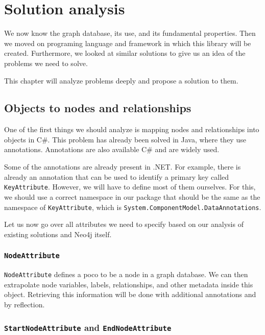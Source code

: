 \chapter {Solution analysis}

We now know the graph database, its use, and its fundamental properties. Then we moved on programing language and framework in which this library will be created.
Furthermore, we looked at similar solutions to give us an idea of the problems we need to solve.

This chapter will analyze problems deeply and propose a solution to them.

\section{Objects to nodes and relationships}

One of the first things we should analyze is mapping nodes and relationships into objects in C\#. This problem has already been
solved in Java, where they use annotations. Annotations are also available C\# and are widely used.

Some of the annotations are already present in .NET. For example, there is already an annotation that can be used to identify a primary
key called \texttt{KeyAttribute}. However, we will have to define most of them ourselves. For this, we should use a correct namespace in our package
that should be the same as the namespace of \texttt{KeyAttribute}, which is \texttt{System.ComponentModel.DataAnnotations}.

Let us now go over all attributes we need to specify based on our analysis of existing solutions and Neo4j itself.

\subsection{\texttt{NodeAttribute}}

\texttt{NodeAttribute} defines a \acrshort{poco} to be a node in a graph database. We can then extrapolate node variables, labels,
relationships, and other metadata inside this object. Retrieving this information will be done with additional annotations and by reflection.


\subsection{\texttt{StartNodeAttribute} and \texttt{EndNodeAttribute}}

